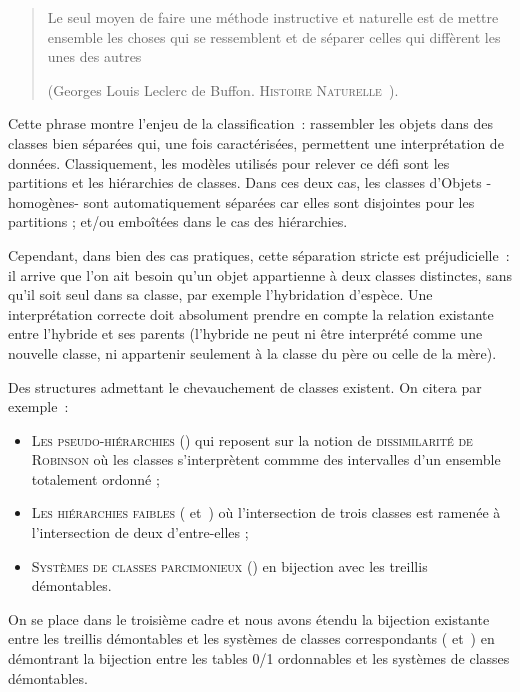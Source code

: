 \documentclass[a4paper]{report}
\begin{document}
\label{intro}

\begin{verse}
\og Le seul moyen de faire une méthode instructive et naturelle est de mettre ensemble les choses qui se ressemblent et de séparer celles qui diffèrent
les unes des autres\fg 

(Georges Louis Leclerc de Buffon. \textsc{Histoire Naturelle}~\cite{histoire}).
\end{verse}
Cette phrase montre l'enjeu de la classification~: rassembler les objets dans des classes bien séparées qui, une fois caractérisées, permettent 
une interprétation de données. Classiquement, les modèles utilisés pour relever ce défi sont les partitions et les hiérarchies de classes. Dans ces deux cas, les classes
 d'Objets -homogènes- sont automatiquement séparées car elles sont disjointes pour les partitions ; et/ou emboîtées dans le cas des hiérarchies.

Cependant, dans bien des cas pratiques, cette séparation stricte est préjudi\-cielle~: il arrive que l'on ait besoin qu'un objet appartienne à deux classes distinctes, sans qu'il soit
 seul dans sa classe, par exemple l'hybridation d'espèce. Une interprétation correcte doit absolument prendre en compte la relation existante entre l'hybride 
et ses parents (l'hybride ne peut ni \^etre interprété comme une nouvelle classe, ni appartenir seulement à la classe du père ou celle de la mère).

Des structures admettant le chevauchement  de classes existent. On citera par exemple~:
\begin{itemize}
 \item \textsc{Les pseudo-hiérarchies} (\cite{dur}) qui reposent sur la notion de \textsc{dissimilarité de Robinson} où les classes s'interprètent commme
 des intervalles d'un ensemble totalement ordonné ;
\item \textsc{Les hiérarchies faibles} (\cite{dia} et~\cite{band}) où l'intersection de trois classes est ramenée à l'intersection de deux d'entre-elles ;
\item \textsc{Systèmes de classes parcimonieux} (\cite{par_clu}) en bijection avec les treillis démon\-tables.
\end{itemize}


On se place dans le troisième cadre et nous avons étendu la bijection existante entre les treillis démontables 
et les systèmes de classes correspondants (\cite{crow_free} et~\cite{par_clu}) en démontrant la bijection entre les tables 0/1
 ordonnables et les systèmes de classes démontables.
\end{document}
